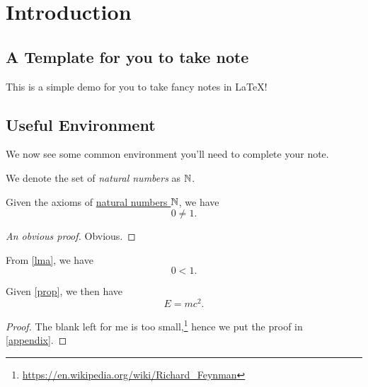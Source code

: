 \chapter{Introduction}
\section{A Template for you to take note}
This is a simple demo for you to take fancy notes in \LaTeX!

\section{Useful Environment}
We now see some common environment you'll need to complete your note.

\begin{definition}\label{def}
	We denote the set of \emph{natural numbers} as \(\mathbb{\MakeUppercase{n}} \).
\end{definition}


\begin{lemma}\label{lma}
	Given the axioms of \hyperref[def]{natural numbers \(\mathbb{\MakeUppercase{n}} \)}, we have
	\[
		0\neq 1.
	\]
\end{lemma}
\begin{proof}[An obvious proof]
	Obvious.
\end{proof}
\begin{proposition}\label{prop}
	From \autoref{lma}, we have
	\[
		0<1.
	\]
\end{proposition}

\begin{theorem}\label{thm}
	Given \autoref{prop}, we then have
	\[
		E = mc^2.
	\]
\end{theorem}
\begin{proof}
	The blank left for me is too small,\footnote{\url{https://en.wikipedia.org/wiki/Richard_Feynman}} hence we put the proof in \autoref{appendix}.
\end{proof}


